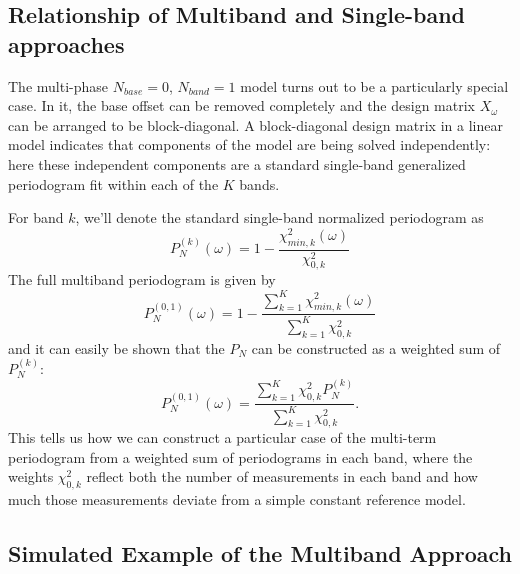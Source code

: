 \documentclass[12pt,preprint]{aastex}
\newcommand{\sectlabel}[1]{\label{sect:#1}}
\begin{document}
\subsection{Relationship of Multiband and Single-band approaches}
\sectlabel{relationship}
The multi-phase $N_{base}=0$, $N_{band}=1$ model turns out to be a particularly special case.
In it, the base offset can be removed completely and the design matrix $X_\omega$ can be arranged to be block-diagonal. A block-diagonal design matrix in a linear model indicates that components of the model are being solved independently: here these independent components are a standard single-band generalized periodogram fit within each of the $K$ bands.

For band $k$, we'll denote the standard single-band normalized periodogram as
\begin{equation}
  P_N^{(k)}(\omega) = 1 - \frac{\chi^2_{min, k}(\omega)}{\chi^2_{0,k}}
\end{equation}
The full multiband periodogram is given by
\begin{equation}
  P_N^{(0,1)}(\omega) = 1 - \frac{\sum_{k=1}^K\chi^2_{min, k}(\omega)}{\sum_{k=1}^K\chi^2_{0,k}}
\end{equation}
and it can easily be shown that the $P_N$ can be constructed as a weighted sum of $P_N^{(k)}$:
\begin{equation}
  P_N^{(0,1)}(\omega) = \frac{\sum_{k=1}^K\chi^2_{0,k}P_N^{(k)}}{\sum_{k=1}^K\chi^2_{0,k}}.
\end{equation}
This tells us how we can construct a particular case of the multi-term periodogram from a weighted sum of periodograms in each band, where the weights $\chi^2_{0,k}$ reflect both the number of measurements in each band and how much those measurements deviate from a simple constant reference model.

\subsection{Simulated Example of the Multiband Approach}
\sectlabel{Simulated}
\end{document}

